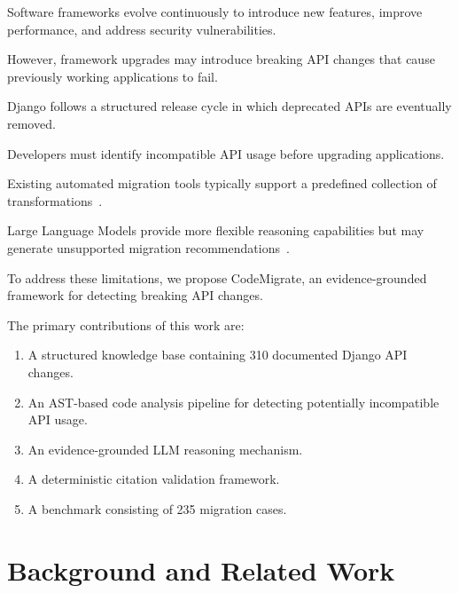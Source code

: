 \documentclass[conference]{IEEEtran}
\begin{document}
Software frameworks evolve continuously to introduce
new features, improve performance, and address security
vulnerabilities.

However, framework upgrades may introduce breaking API
changes that cause previously working applications to fail.

Django follows a structured release cycle in which
deprecated APIs are eventually removed.

Developers must identify incompatible API usage before
upgrading applications.

Existing automated migration tools typically support
a predefined collection of transformations~\cite{djangoupgrade,pyupgrade}.

Large Language Models provide more flexible reasoning
capabilities but may generate unsupported migration
recommendations~\cite{wang2025deprecated,spracklen2025package}.

To address these limitations, we propose CodeMigrate,
an evidence-grounded framework for detecting breaking
API changes.

The primary contributions of this work are:

\begin{enumerate}

\item A structured knowledge base containing 310
documented Django API changes.

\item An AST-based code analysis pipeline for detecting
potentially incompatible API usage.

\item An evidence-grounded LLM reasoning mechanism.

\item A deterministic citation validation framework.

\item A benchmark consisting of 235 migration cases.

\end{enumerate}

\section{Background and Related Work}

\end{document}
